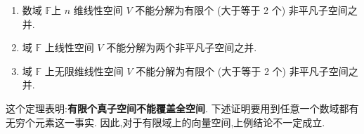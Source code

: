 \documentclass[../../main.tex]{subfiles}%
\begin{document}
\begin{theorem}[覆盖定理]\label{theorem:覆盖定理}
\begin{enumerate}[(1)]
\item\label{theorem:覆盖定理-1} 数域 \( \mathbb{F} \)上 \( n \) 维线性空间 \( V \) 不能分解为有限个 (大于等于 2 个) 非平凡子空间之并.  

\item\label{theorem:覆盖定理-2} 域 \( \mathbb{F} \) 上线性空间 \( V \) 不能分解为两个非平凡子空间之并. 

\item\label{theorem:覆盖定理-3} 域 \( \mathbb{F} \) 上无限维线性空间 \( V \) 不能分解为有限个 (大于等于 2 个) 非平凡子空间之并.  
\end{enumerate}
\end{theorem}
\begin{remark}
这个定理表明:\textbf{有限个真子空间不能覆盖全空间}.
下述证明要用到任意一个数域都有无穷个元素这一事实. 因此,对于有限域上的向量空间,上例结论不一定成立.
\end{remark}
\end{document}
